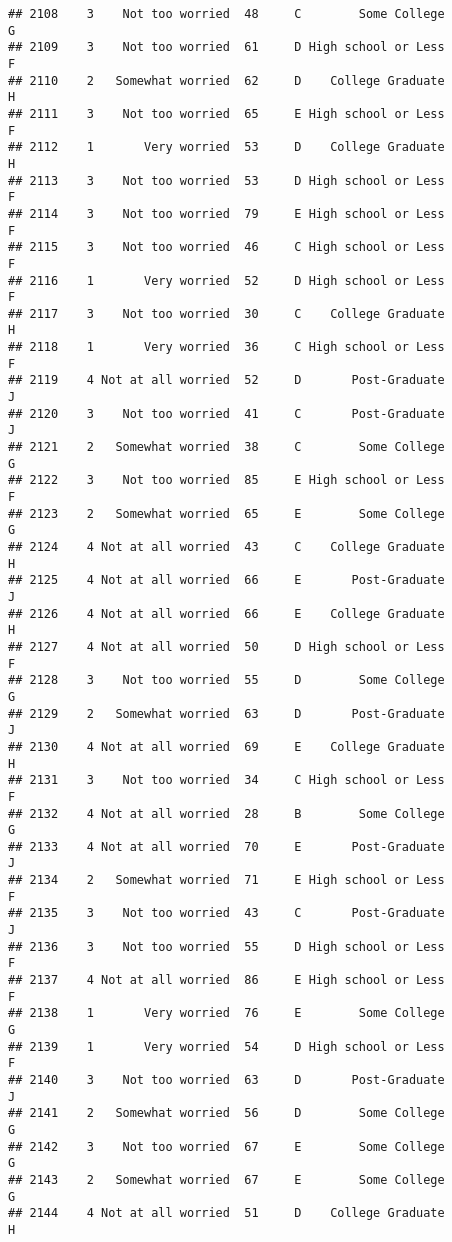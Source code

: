 \documentclass[
]{article}
\begin{document}
\begin{verbatim}
## 2108    3    Not too worried  48     C        Some College         G
## 2109    3    Not too worried  61     D High school or Less         F
## 2110    2   Somewhat worried  62     D    College Graduate         H
## 2111    3    Not too worried  65     E High school or Less         F
## 2112    1       Very worried  53     D    College Graduate         H
## 2113    3    Not too worried  53     D High school or Less         F
## 2114    3    Not too worried  79     E High school or Less         F
## 2115    3    Not too worried  46     C High school or Less         F
## 2116    1       Very worried  52     D High school or Less         F
## 2117    3    Not too worried  30     C    College Graduate         H
## 2118    1       Very worried  36     C High school or Less         F
## 2119    4 Not at all worried  52     D       Post-Graduate         J
## 2120    3    Not too worried  41     C       Post-Graduate         J
## 2121    2   Somewhat worried  38     C        Some College         G
## 2122    3    Not too worried  85     E High school or Less         F
## 2123    2   Somewhat worried  65     E        Some College         G
## 2124    4 Not at all worried  43     C    College Graduate         H
## 2125    4 Not at all worried  66     E       Post-Graduate         J
## 2126    4 Not at all worried  66     E    College Graduate         H
## 2127    4 Not at all worried  50     D High school or Less         F
## 2128    3    Not too worried  55     D        Some College         G
## 2129    2   Somewhat worried  63     D       Post-Graduate         J
## 2130    4 Not at all worried  69     E    College Graduate         H
## 2131    3    Not too worried  34     C High school or Less         F
## 2132    4 Not at all worried  28     B        Some College         G
## 2133    4 Not at all worried  70     E       Post-Graduate         J
## 2134    2   Somewhat worried  71     E High school or Less         F
## 2135    3    Not too worried  43     C       Post-Graduate         J
## 2136    3    Not too worried  55     D High school or Less         F
## 2137    4 Not at all worried  86     E High school or Less         F
## 2138    1       Very worried  76     E        Some College         G
## 2139    1       Very worried  54     D High school or Less         F
## 2140    3    Not too worried  63     D       Post-Graduate         J
## 2141    2   Somewhat worried  56     D        Some College         G
## 2142    3    Not too worried  67     E        Some College         G
## 2143    2   Somewhat worried  67     E        Some College         G
## 2144    4 Not at all worried  51     D    College Graduate         H

\end{verbatim}
\end{document}
